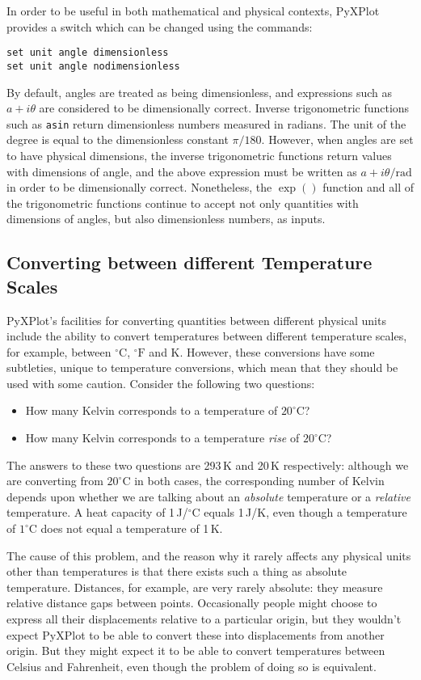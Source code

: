 In order to be useful in both mathematical and physical contexts, PyXPlot
provides a switch which can be changed using the commands:
\begin{verbatim}
set unit angle dimensionless
set unit angle nodimensionless
\end{verbatim}
By default, angles are treated as being dimensionless, and expressions such as
$a+i\theta$ are considered to be dimensionally correct. Inverse trigonometric
functions such as {\tt asin} return dimensionless numbers measured in radians.
The unit of the degree is equal to the dimensionless constant $\pi/180$.
However, when angles are set to have physical dimensions, the inverse
trigonometric functions return values with dimensions of angle, and the above
expression must be written as $a+i\theta/\mathrm{rad}$ in order to be
dimensionally correct.  Nonetheless, the $\exp()$ function and all of the
trigonometric functions continue to accept not only quantities with dimensions
of angles, but also dimensionless numbers, as inputs.

\subsection{Converting between different Temperature Scales}

PyXPlot's facilities for converting quantities between different physical units
include the ability to convert temperatures between different temperature
scales, for example, between $^\circ\mathrm{C}$, $^\circ\mathrm{F}$ and K.
However, these conversions have some subtleties, unique to temperature
conversions, which mean that they should be used with some caution. Consider
the following two questions:
\begin{itemize}
\item How many Kelvin corresponds to a temperature of $20^\circ$C?
\item How many Kelvin corresponds to a temperature {\it rise} of $20^\circ$C?
\end{itemize}
The answers to these two questions are 293\,K and 20\,K respectively: although
we are converting from $20^\circ$C in both cases, the corresponding number of
Kelvin depends upon whether we are talking about an {\it absolute} temperature
or a {\it relative} temperature. A heat capacity of 1\,J/$^\circ$C equals
1\,J/K, even though a temperature of $1^\circ$C does not equal a temperature of
1\,K.

The cause of this problem, and the reason why it rarely affects any physical
units other than temperatures is that there exists such a thing as absolute
temperature. Distances, for example, are very rarely absolute: they measure
relative distance gaps between points. Occasionally people might choose to
express all their displacements relative to a particular origin, but they
wouldn't expect PyXPlot to be able to convert these into displacements from
another origin. But they might expect it to be able to convert temperatures
between Celsius and Fahrenheit, even though the problem of doing so is
equivalent.

